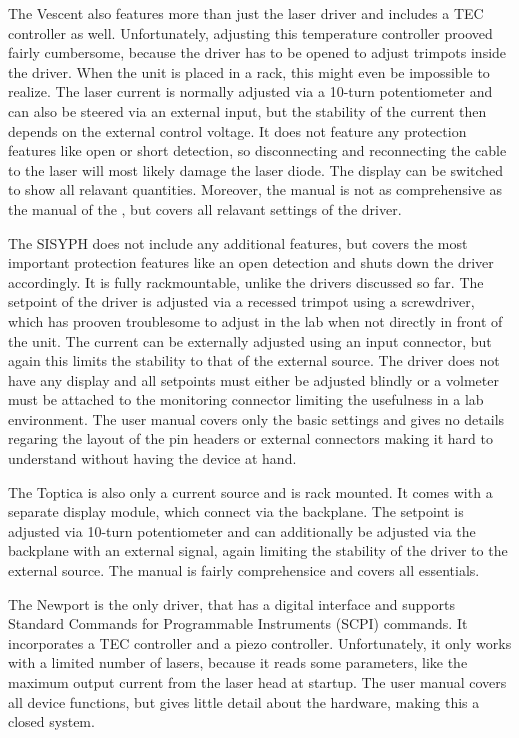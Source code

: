 The Vescent  also features more than just the laser driver and includes a TEC controller as well. Unfortunately, adjusting this temperature controller prooved fairly cumbersome, because the driver has to be opened to adjust trimpots inside the driver. When the unit is placed in a rack, this might even be impossible to realize. The laser current is normally adjusted via a 10-turn potentiometer and can also be steered via an external input, but the stability of the current then depends on the external control voltage. It does not feature any protection features like open or short detection, so disconnecting and reconnecting the cable to the laser will most likely damage the laser diode. The display can be switched to show all relavant quantities. Moreover, the manual is not as comprehensive as the manual of the , but covers all relavant settings of the driver.

The SISYPH  does not include any additional features, but covers the most important protection features like an open detection and shuts down the driver accordingly. It is fully rackmountable, unlike the drivers discussed so far. The setpoint of the driver is adjusted via a recessed trimpot using a screwdriver, which has prooven troublesome to adjust in the lab when not directly in front of the unit. The current can be externally adjusted using an input connector, but again this limits the stability to that of the external source. The driver does not have any display and all setpoints must either be adjusted blindly or a volmeter must be attached to the monitoring connector limiting the usefulness in a lab environment. The user manual covers only the basic settings and gives no details regaring the layout of the pin headers or external connectors making it hard to understand without having the device at hand.

The Toptica  is also only a current source and is rack mounted. It comes with a separate display module, which connect via the backplane. The setpoint is adjusted via 10-turn potentiometer and can additionally be adjusted via the backplane with an external signal, again limiting the stability of the driver to the external source. The manual is fairly comprehensice and covers all essentials.

The Newport  is the only driver, that has a digital interface and supports Standard Commands for Programmable Instruments (SCPI) commands. It incorporates a TEC controller and a piezo controller. Unfortunately, it only works with a limited number of lasers, because it reads some parameters, like the maximum output current from the laser head at startup. The user manual covers all device functions, but gives little detail about the hardware, making this a closed system.

